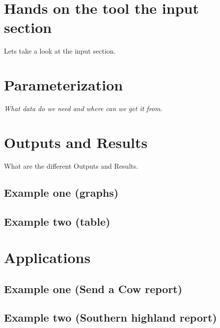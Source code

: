 \documentclass[
]{book}
\begin{document}
\hypertarget{hands-on-the-tool-the-input-section}{%
\chapter{Hands on the tool the input section}\label{hands-on-the-tool-the-input-section}}

Lets take a look at the input section.

\hypertarget{parameterization}{%
\chapter{Parameterization}\label{parameterization}}

\emph{What data do we need and where can we get it from}.

\hypertarget{outputs-and-results}{%
\chapter{Outputs and Results}\label{outputs-and-results}}

What are the different Outputs and Results.

\hypertarget{example-one-graphs}{%
\section{Example one (graphs)}\label{example-one-graphs}}

\hypertarget{example-two-table}{%
\section{Example two (table)}\label{example-two-table}}

\hypertarget{applications}{%
\chapter{Applications}\label{applications}}

\hypertarget{example-one-send-a-cow-report}{%
\section{Example one (Send a Cow report)}\label{example-one-send-a-cow-report}}

\hypertarget{example-two-southern-highland-report}{%
\section{Example two (Southern highland report)}\label{example-two-southern-highland-report}}

  
\end{document}
